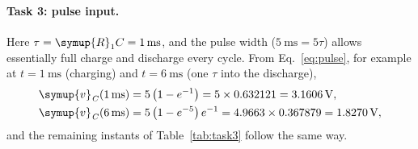 \documentclass[12pt,a4paper]{article}
\begin{document}
	\paragraph{Task 3: pulse input.}
	Here $\tau = \symup{R}_{1} C = \SI{1}{\milli\second}$, and the pulse width
	($\SI{5}{\milli\second} = 5\tau$) allows essentially full charge and
	discharge every cycle.  From Eq.~\eqref{eq:pulse}, for example at
	$t = \SI{1}{\milli\second}$ (charging) and $t = \SI{6}{\milli\second}$
	(one $\tau$ into the discharge),
	\begin{align}
		\symup{v}_{\mathit{C}}(\SI{1}{\milli\second}) &= 5\left(1 - e^{-1}\right)
		= 5 \times 0.632121 = \SI{3.1606}{\volt}, \\
		\symup{v}_{\mathit{C}}(\SI{6}{\milli\second}) &= 5\left(1 - e^{-5}\right)e^{-1}
		= 4.9663 \times 0.367879 = \SI{1.8270}{\volt},
	\end{align}
	and the remaining instants of Table~\ref{tab:task3} follow the same
	way.
	
\end{document}
